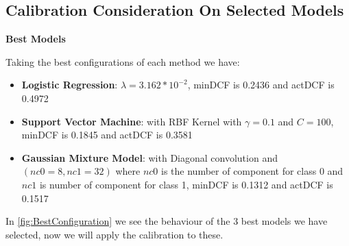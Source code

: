 
\subsection{Calibration Consideration On Selected Models}
\label{subsec:bestModels}
\textbf{Best Models}

Taking the best configurations of each method we have:
\begin{itemize}
    \item \textbf{Logistic Regression}: \(\lambda=3.162*10^{-2}\), minDCF is 0.2436 and actDCF is 0.4972
    \item \textbf{Support Vector Machine}: with RBF Kernel with \(\gamma=0.1\) and \(C=100\), minDCF is 0.1845 and actDCF is 0.3581
    \item \textbf{Gaussian Mixture Model}: with Diagonal convolution and \((nc0=8, nc1=32)\) where \(nc0\) is the number of
    component for class 0 and \(nc1\) is number of component for class 1, minDCF is 0.1312 and actDCF is 0.1517
\end{itemize}

In \autoref{fig:BestConfiguration} we see the behaviour of the 3 best models we have selected, now we will apply the calibration to these.


